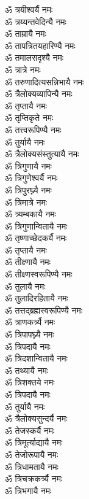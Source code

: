 \begin{flushleft}
\begin{multicols}{2}
ॐ त्रयीश्वर्यै नमः\\
ॐ त्रय्यन्तवेदिन्यै नमः\\
ॐ ताम्रायै नमः\\
ॐ तापत्रितयहारिण्यै नमः\\
ॐ तमालसदृश्यै नमः\\
ॐ त्रात्रे नमः\\
ॐ तरुणादित्यसन्निभायै नमः\hfill{}\\
ॐ त्रैलोक्यव्यापिन्यै नमः\\
ॐ तृप्तायै नमः\\
ॐ तृप्तिकृते नमः\\
ॐ तत्त्वरूपिण्यै नमः\\
ॐ तुर्यायै नमः\\
ॐ त्रैलोक्यसंस्तुत्यायै नमः\\
ॐ त्रिगुणायै नमः\\
ॐ त्रिगुणेश्वर्यै नमः\\
ॐ त्रिपुरघ्न्यै नमः\\
ॐ त्रिमात्रे नमः\hfill{}\\
ॐ त्र्यम्बकायै नमः\\
ॐ त्रिगुणान्वितायै नमः\\
ॐ तृष्णाच्छेदकर्यै नमः\\
ॐ तृप्तायै नमः\\
ॐ तीक्ष्णायै नमः\\
ॐ तीक्ष्णस्वरूपिण्यै नमः\\
ॐ तुलायै नमः\\
ॐ तुलादिरहितायै नमः\\
ॐ तत्तद्ब्रह्मस्वरूपिण्यै नमः\\
ॐ त्राणकर्त्र्यै नमः\hfill{}\\
ॐ त्रिपापघ्न्यै नमः\\
ॐ त्रिपदायै नमः\\
ॐ त्रिदशान्वितायै नमः\\
ॐ तथ्यायै नमः\\
ॐ त्रिशक्तये नमः\\
ॐ त्रिपदायै नमः\\
ॐ तुर्यायै नमः\\
ॐ त्रैलोक्यसुन्दर्यै नमः\\
ॐ तेजस्कर्यै नमः\\
ॐ त्रिमूर्त्याद्यायै नमः\hfill{}\\
ॐ तेजोरूपायै नमः\\
ॐ त्रिधामतायै नमः\\
ॐ त्रिचक्रकर्त्र्यै नमः\\
ॐ त्रिभगायै नमः\\

\end{multicols}
\end{flushleft}
